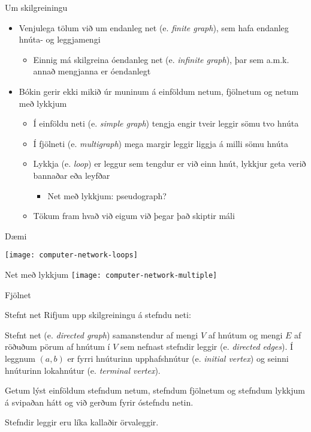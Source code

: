 \documentclass[handout]{beamer}
\begin{document}
\begin{frame}{Um skilgreiningu}
\begin{itemize}
 \item Venjulega tölum við um endanleg net (e. \emph{finite graph}), sem hafa endanleg hnúta- og leggjamengi
 \begin{itemize}
  \item Einnig má skilgreina óendanleg net (e. \emph{infinite graph}), þar sem a.m.k. annað mengjanna er óendanlegt
 \end{itemize}
 \item Bókin gerir ekki mikið úr muninum á einföldum netum, fjölnetum og netum með lykkjum
 \begin{itemize}
  \item Í einföldu neti (e. \emph{simple graph}) tengja engir tveir leggir sömu tvo hnúta
  \item Í fjölneti (e. \emph{multigraph}) mega margir leggir liggja á milli sömu hnúta
  \item Lykkja (e. \emph{loop}) er leggur sem tengdur er við einn hnút, lykkjur geta verið bannaðar eða leyfðar
  \begin{itemize}
   \item Net með lykkjum: pseudograph?
  \end{itemize}
  \item Tökum fram hvað við eigum við þegar það skiptir máli
 \end{itemize}
\end{itemize}
\end{frame}

\begin{frame}{Dæmi}
\begin{center}
\texttt{[image: computer-network-loops]}

Net með lykkjum
\texttt{[image: computer-network-multiple]}

Fjölnet
\end{center}
\end{frame}

\begin{frame}{Stefnt net}
Rifjum upp skilgreiningu á stefndu neti:
\begin{tcolorbox}[title=Stefnt net]
Stefnt net (e. \emph{directed graph}) samanstendur af mengi $V$ af hnútum og mengi $E$ af röðuðum pörum af hnútum í $V$ sem nefnast stefndir leggir (e. \emph{directed edges}). Í leggnum $(a, b)$ er fyrri hnúturinn upphafshnútur (e. \emph{initial vertex}) og seinni hnúturinn lokahnútur (e. \emph{terminal vertex}).
\end{tcolorbox}

Getum lýst einföldum stefndum netum, stefndum fjölnetum og stefndum lykkjum á svipaðan hátt og við gerðum fyrir óstefndu netin.

Stefndir leggir eru líka kallaðir örvaleggir.
\end{frame}
\end{document}
